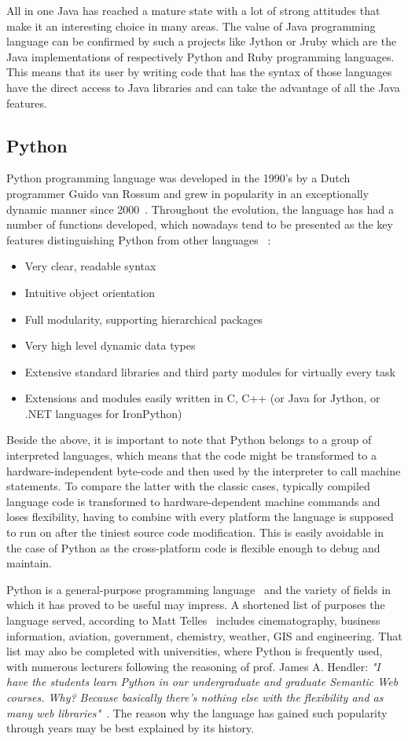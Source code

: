 All in one Java has reached a mature state with a lot of strong attitudes that make it an interesting choice in many areas. The value of Java programming language can be confirmed by such a projects like Jython or Jruby which are the Java implementations of respectively Python and Ruby programming languages. This means that its user by writing code that has the syntax of those languages have the direct access to Java libraries and can take the advantage of all the Java features.  

\subsection{Python}\label{subsec:py}
Python programming language was developed in the 1990's by a Dutch programmer Guido van Rossum and grew in popularity in an exceptionally dynamic manner since 2000~\cite{py_code_swarm}. Throughout the evolution, the language has had a number of functions developed, which nowadays tend to be presented as the key features distinguishing Python from other languages ~\cite{py_about}:
\begin{itemize}
\item{Very clear, readable syntax}
\item{Intuitive object orientation}
\item{Full modularity, supporting hierarchical packages}
\item{Very high level dynamic data types}
\item{Extensive standard libraries and third party modules for virtually every task}
\item{Extensions and modules easily written in C, C++ (or Java for Jython, or .NET languages for IronPython)}
\end{itemize}
Beside the above, it is important to note that Python belongs to a group of interpreted languages, which means that the code might be transformed to a hardware-independent byte-code and then used by the interpreter to call machine statements. To compare the latter with the classic cases, typically compiled language code is transformed to hardware-dependent machine commands and loses flexibility, having to combine with every platform the language is supposed to run on after the tiniest source code modification. This is easily avoidable in the case of Python as the cross-platform code is flexible enough to debug and maintain. 

Python is a general-purpose programming language~\cite[page 3]{py_nutshell} and the variety of fields in which it has proved to be useful may impress. A shortened list of purposes the language served, according to Matt Telles~\cite[page 13]{py_power} includes cinematography, business information, aviation, government, chemistry, weather, GIS and engineering. That list may also be completed with universities, where Python is frequently used, with numerous lecturers following the reasoning of prof. James A. Hendler: \textit{"I have the students learn Python in our undergraduate and graduate Semantic Web courses. Why? Because basically there's nothing else with the flexibility and as many web libraries"}~\cite{py_quote}. The reason why the language has gained such popularity through years may be best explained by its history.

